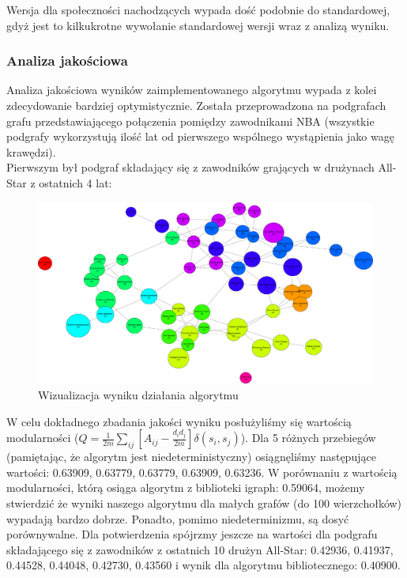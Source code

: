 \documentclass{article}
\begin{document}
Wersja dla społeczności nachodzących wypada dość podobnie do standardowej, gdyż jest to kilkukrotne wywołanie standardowej wersji wraz z analizą wyniku.

\subsubsection{Analiza jakościowa}
	Analiza jakościowa wyników zaimplementowanego algorytmu wypada z kolei zdecydowanie bardziej optymistycznie. Została przeprowadzona na  podgrafach grafu przedstawiającego połączenia pomiędzy zawodnikami NBA (wszystkie podgrafy wykorzystują ilość lat od pierwszego wspólnego wystąpienia jako wagę krawędzi). \\

Pierwszym  był podgraf składający się z zawodników grających w drużynach All-Star z ostatnich 4 lat:

\begin{figure}[H]
\centering
\includegraphics[width=\textwidth]{images/pw_img1.png}
\caption{Wizualizacja wyniku działania algorytmu}
\end{figure}

W celu dokładnego zbadania jakości wyniku posłużyliśmy się wartością modularności ($Q= \frac{1}{2m} \sum\limits_{ij} [A_{ij} - \frac{d_i d_j}{2m}]\delta(s_i,s_j)$). Dla 5 różnych przebiegów (pamiętając, że algorytm jest niedeterministyczny) osiągnęliśmy następujące wartości: 0.63909, 0.63779, 0.63779, 0.63909, 0.63236. W porównaniu z wartością modularności, którą osiąga algorytm z biblioteki igraph: 0.59064, możemy stwierdzić że wyniki naszego algorytmu dla małych grafów (do 100 wierzchołków) wypadają bardzo dobrze. Ponadto, pomimo niedeterminizmu, są dosyć porównywalne. Dla potwierdzenia spójrzmy jeszcze na wartości dla podgrafu składającego się z zawodników z ostatnich 10 drużyn All-Star: 0.42936, 0.41937, 0.44528, 0.44048, 0.42730, 0.43560 i wynik  dla algorytmu bibliotecznego: 0.40900.\\\\ 
\end{document}
